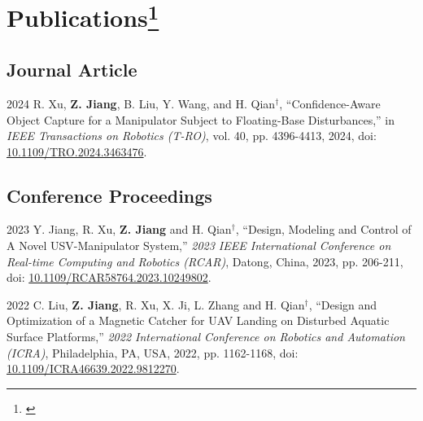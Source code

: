 \documentclass[11pt,letterpaper]{report}
\begin{document}
\section*{Publications\protect\footnote{\label{authorship}}}
\subsection*{Journal Article}
\begin{tablist}
	\item[2024]  \tab{}R. Xu, \textbf{Z. Jiang}, B. Liu, Y. Wang, and H. Qian$^\dagger$, ``Confidence-Aware Object Capture for a Manipulator Subject to Floating-Base Disturbances,'' in \textit{IEEE Transactions on Robotics (T-RO)}, vol. 40, pp. 4396-4413, 2024,  doi: \href{https://doi.org/10.1109/TRO.2024.3463476}{10.1109/TRO.2024.3463476}.
\end{tablist}
	
\subsection*{Conference Proceedings}
\begin{tablist}
	\item[2023]   \tab{}Y. Jiang, R. Xu, \textbf{Z. Jiang} and H. Qian$^\dagger$, ``Design, Modeling and Control of A Novel USV-Manipulator System,'' \textit{2023 IEEE International Conference on Real-time Computing and Robotics (RCAR)}, Datong, China, 2023, pp. 206-211, doi: \href{https://doi.org/10.1109/RCAR58764.2023.10249802}{ 10.1109/RCAR58764.2023.10249802}.
		
	\item[2022]   \tab{}C. Liu, \textbf{Z. Jiang}, R. Xu, X. Ji, L. Zhang and H. Qian$^\dagger$, ``Design and Optimization of a Magnetic Catcher for UAV Landing on Disturbed Aquatic Surface Platforms,'' \textit{2022 International Conference on Robotics and Automation (ICRA)}, Philadelphia, PA, USA, 2022, pp. 1162-1168, doi: \href{https://doi.org/10.1109/ICRA46639.2022.9812270}{ 10.1109/ICRA46639.2022.9812270}.
\end{tablist}
	
\end{document}
